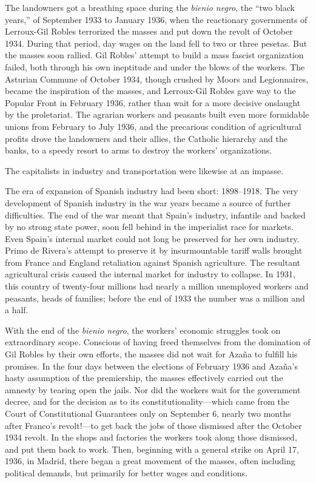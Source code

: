 The landowners got a breathing space during the \emph{bienio negro}, the ``two black years,'' of September 1933 to January 1936, when the reactionary governments of Lerroux-Gil Robles terrorized the masses and put down the revolt of October 1934. During that period, day wages on the land fell to two or three pesetas. But the masses soon rallied. Gil Robles’ attempt to build a mass fascist organization failed, both through his own ineptitude and under the blows of the workers. The Asturian Commune of October 1934, though crushed by Moors and Legionnaires, became the inspiration of the masses, and Lerroux-Gil Robles gave way to the Popular Front in February 1936, rather than wait for a more decisive onslaught by the proletariat. The agrarian workers and peasants built even more formidable unions from February to July 1936, and the precarious condition of agricultural profits drove the landowners and their allies, the Catholic hierarchy and the banks, to a speedy resort to arms to destroy the workers’ organizations.

The capitalists in industry and transportation were likewise at an impasse.

The era of expansion of Spanish industry had been short: 1898--1918. The very development of Spanish industry in the war years became a source of further difficulties. The end of the war meant that Spain’s industry, infantile and backed by no strong state power, soon fell behind in the imperialist race for markets. Even Spain’s internal market could not long be preserved for her own industry. Primo de Rivera’s attempt to preserve it by insurmountable tariff walls brought from France and England retaliation against Spanish agriculture. The resultant agricultural crisis caused the internal market for industry to collapse. In 1931, this country of twenty-four millions had nearly a million unemployed workers and peasants, heads of families; before the end of 1933 the number was a million and a half.

With the end of the \emph{bienio negro}, the workers’ economic struggles took on extraordinary scope. Conscious of having freed themselves from the domination of Gil Robles by their own efforts, the masses did not wait for Azaña to fulfill his promises. In the four days between the elections of February 1936 and Azaña’s hasty assumption of the premiership, the masses effectively carried out the amnesty by tearing open the jails. Nor did the workers wait for the government decree, and for the decision as to its constitutionality---which came from the Court of Constitutional Guarantees only on September 6, nearly two months after Franco’s revolt!---to get back the jobs of those dismissed after the October 1934 revolt. In the shops and factories the workers took along those dismissed, and put them back to work. Then, beginning with a general strike on April 17, 1936, in Madrid, there began a great movement of the masses, often including political demands, but primarily for better wages and conditions.

